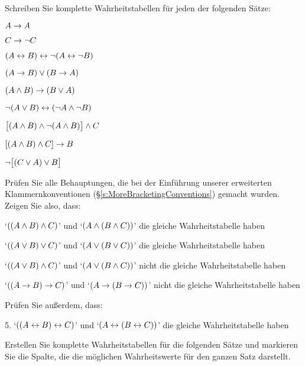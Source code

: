 \practiceproblems\label{pr.TT.TTorC}
\problempart
Schreiben Sie komplette Wahrheitstabellen für jeden der folgenden Sätze:
\begin{earg}
\item $A \rightarrow A$ %
\item $C \rightarrow\neg C$ %
\item $(A \leftrightarrow B) \leftrightarrow \neg(A\leftrightarrow \neg B)$ %
\item $(A \rightarrow B) \vee (B \rightarrow A)$ %
\item $(A \wedge B) \rightarrow (B \vee A)$  %
\item $\neg(A \vee B) \leftrightarrow (\neg A \wedge \neg B)$ %
\item $\bigl[(A\wedge B) \wedge\neg(A\wedge B)\bigr] \wedge C$ %
\item $[(A \wedge B) \wedge C] \rightarrow B$ %
\item $\neg\bigl[(C\vee A) \vee B\bigr]$ %
\end{earg}
\problempart
Prüfen Sie alle Behauptungen, die bei der Einführung unserer erweiterten Klammernkonventionen (\S\ref{s:MoreBracketingConventions}) gemacht wurden. Zeigen Sie also, dass:
\begin{earg}
	\item `$((A \wedge B) \wedge C)$' und `$(A \wedge (B \wedge C))$' die gleiche Wahrheitstabelle haben
	\item `$((A \vee B) \vee C)$' und `$(A \vee (B \vee C))$' die gleiche Wahrheitstabelle haben
	\item `$((A \vee B) \wedge C)$' und `$(A \vee (B \wedge C))$' nicht die gleiche Wahrheitstabelle haben
	\item `$((A \rightarrow B) \rightarrow C)$' und `$(A \rightarrow (B \rightarrow C))$' nicht die gleiche Wahrheitstabelle haben
\end{earg}
Prüfen Sie au{\ss}erdem, dass:
\begin{earg}
	\item[5.] `$((A \leftrightarrow B) \leftrightarrow C)$' und `$(A \leftrightarrow (B \leftrightarrow C))$' die gleiche Wahrheitstabelle haben
\end{earg}

\problempart
Erstellen Sie komplette Wahrheitstabellen für die folgenden Sätze und markieren Sie die Spalte, die die möglichen Wahrheitswerte für den ganzen Satz darstellt.


